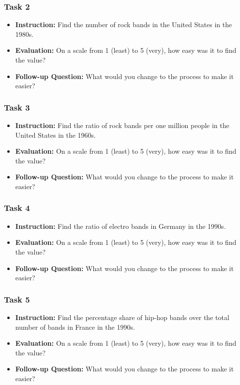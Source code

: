 \documentclass[twocolumn, letterpaper,13pt]{scrartcl}
\begin{document}
    \subsubsection*{Task 2}
    \begin{itemize}
        \item \textbf{Instruction:} Find the number of rock bands in the United States in the 1980s.
        \item \textbf{Evaluation:} On a scale from 1 (least) to 5 (very), how easy was it to find the value?
        \item \textbf{Follow-up Question:} What would you change to the process to make it easier?
    \end{itemize}
    
    \subsubsection*{Task 3}
    \begin{itemize}
        \item \textbf{Instruction:} Find the ratio of rock bands per one million people in the United States in the 1960s.
        \item \textbf{Evaluation:} On a scale from 1 (least) to 5 (very), how easy was it to find the value?
        \item \textbf{Follow-up Question:} What would you change to the process to make it easier?
    \end{itemize}
    
    \subsubsection*{Task 4}
    \begin{itemize}
        \item \textbf{Instruction:} Find the ratio of electro bands in Germany in the 1990s.
        \item \textbf{Evaluation:} On a scale from 1 (least) to 5 (very), how easy was it to find the value?
        \item \textbf{Follow-up Question:} What would you change to the process to make it easier?
    \end{itemize}
    
    \subsubsection*{Task 5}
    \begin{itemize}
        \item \textbf{Instruction:} Find the percentage share of hip-hop bands over the total number of bands in France in the 1990s.
        \item \textbf{Evaluation:} On a scale from 1 (least) to 5 (very), how easy was it to find the value?
        \item \textbf{Follow-up Question:} What would you change to the process to make it easier?
    \end{itemize}
    
\end{document}
